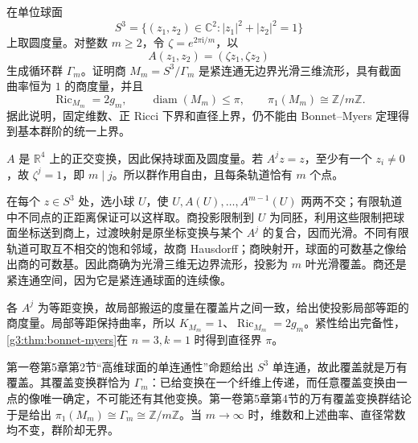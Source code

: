 \begin{exercise}\label{g3:ex:myers-unbounded-finite-group-order}
	在单位球面
	\[
		S^3=\{(z_1,z_2)\in\mathbb C^2:|z_1|^2+|z_2|^2=1\}
	\]
	上取圆度量。对整数 \(m\ge2\)，令 \(\zeta=e^{2\pi\mathrm{i}/m}\)，以
	\[
		A(z_1,z_2)=(\zeta z_1,\zeta z_2)
	\]
	生成循环群 \(\Gamma_m\)。证明商 \(M_m=S^3/\Gamma_m\) 是紧连通无边界光滑三维流形，具有截面曲率恒为 \(1\) 的商度量，并且
	\[
		\operatorname{Ric}_{M_m}=2g_m,\qquad
		\operatorname{diam}(M_m)\le\pi,\qquad
		\pi_1(M_m)\cong\mathbb Z/m\mathbb Z.
	\]
	据此说明，固定维数、正 Ricci 下界和直径上界，仍不能由 Bonnet--Myers 定理得到基本群阶的统一上界。
\end{exercise}
\begin{solution}
	\(A\) 是 \(\mathbb R^4\) 上的正交变换，因此保持球面及圆度量。若 \(A^jz=z\)，至少有一个 \(z_i\ne0\)，故 \(\zeta^j=1\)，即 \(m\mid j\)。所以群作用自由，且每条轨道恰有 \(m\) 个点。

	在每个 \(z\in S^3\) 处，选小球 \(U\)，使 \(U,A(U),\ldots,A^{m-1}(U)\) 两两不交；有限轨道中不同点的正距离保证可以这样取。商投影限制到 \(U\) 为同胚，利用这些限制把球面坐标送到商上，过渡映射是原坐标变换与某个 \(A^j\) 的复合，因而光滑。不同有限轨道可取互不相交的饱和邻域，故商 Hausdorff；商映射开，球面的可数基之像给出商的可数基。因此商确为光滑三维无边界流形，投影为 \(m\) 叶光滑覆盖。商还是紧连通空间，因为它是紧连通球面的连续像。

	各 \(A^j\) 为等距变换，故局部搬运的度量在覆盖片之间一致，给出使投影局部等距的商度量。局部等距保持曲率，所以 \(K_{M_m}=1\)、\(\operatorname{Ric}_{M_m}=2g_m\)。紧性给出完备性，\cref{g3:thm:bonnet-myers}在 \(n=3,k=1\) 时得到直径界 \(\pi\)。

	第一卷第5章第2节“高维球面的单连通性”命题给出 \(S^3\) 单连通，故此覆盖就是万有覆盖。其覆盖变换群恰为 \(\Gamma_m\)：已给变换在一个纤维上传递，而任意覆盖变换由一点的像唯一确定，不可能还有其他变换。第一卷第5章第4节的万有覆盖变换群结论于是给出 \(\pi_1(M_m)\cong\Gamma_m\cong\mathbb Z/m\mathbb Z\)。当 \(m\to\infty\) 时，维数和上述曲率、直径常数均不变，群阶却无界。
\end{solution}

